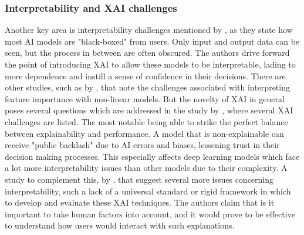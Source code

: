 
\subsubsection*{Interpretability and XAI challenges}
Another key area is interpretability challenges mentioned by \cite{atlam2022business}, as they state how most AI models are "black-boxed" from users. Only input and output data can be seen, but the process in between are often obscured. The authors drive forward the point of introducing XAI to allow these models to be interpretable, lading to more dependence and instill a sense of confidence in their decisions. There are other studies, such as by \cite{al2024novel}, that note the challenges associated with interpreting feature importance with non-linear models. But the novelty of XAI in general poses several questions which are addressed in the study by \cite{yakandawala2023review}, where several XAI challenges are listed. The most notable being able to strike the perfect balance between explainability and performance. A model that is non-explainable can receive "public backlash" due to AI errors and biases, lessening trust in their decision making processes. This especially affects deep learning models which face a lot more interpretability issues than other models due to their complexity. A study to complement this, by \cite{reddy2023explainable}, that suggest several more issues concerning interpretability, such a lack of a universal standard or rigid framework in which to develop and evaluate these XAI techniques. The authors claim that is it important to take human factors into account, and it would prove to be effective to understand how users would interact with such explanations.
